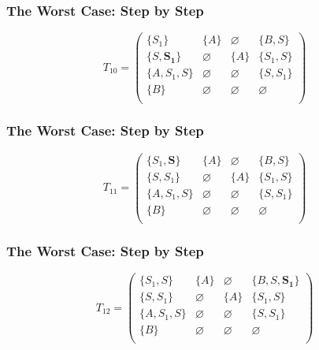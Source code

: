 \documentclass[xcolor=table]{beamer}
\begin{document}
\begin{frame}[noframenumbering]

  \frametitle{The Worst Case: Step by Step}
\begin{figure}[h]
\[
T_{10} = \begin{pmatrix}
\{S_1\}     & \{A\}       & \varnothing & \{B, S\}    \\
\{S, \pmb{S_1}\}       & \varnothing & \{A\}       & \{S_1, S\}     \\
\{A, S_1, S\}  & \varnothing & \varnothing & \{S, S_1\} \\
\{B\}       & \varnothing & \varnothing & \varnothing \\
\end{pmatrix}
\]
\label{ExampleQueryFirstIteration}
\end{figure}
\end{frame}

\begin{frame}[noframenumbering]

  \frametitle{The Worst Case: Step by Step}

\begin{figure}[h]
\[
T_{11} = \begin{pmatrix}
\{S_1, \pmb{S}\}     & \{A\}       & \varnothing & \{B, S\}    \\
\{S, S_1\}       & \varnothing & \{A\}       & \{S_1, S\}     \\
\{A, S_1, S\}  & \varnothing & \varnothing & \{S, S_1\} \\
\{B\}       & \varnothing & \varnothing & \varnothing \\
\end{pmatrix}
\]
\label{ExampleQueryFirstIteration}
\end{figure}
\end{frame}

\begin{frame}[noframenumbering]

  \frametitle{The Worst Case: Step by Step}

\begin{figure}[h]
\[
T_{12} = \begin{pmatrix}
\{S_1, S\}     & \{A\}       & \varnothing & \{B, S, \pmb{S_1}\}    \\
\{S, S_1\}       & \varnothing & \{A\}       & \{S_1, S\}     \\
\{A, S_1, S\}  & \varnothing & \varnothing & \{S, S_1\} \\
\{B\}       & \varnothing & \varnothing & \varnothing \\
\end{pmatrix}
\]
\label{ExampleQueryFirstIteration}
\end{figure}
\end{frame}
\end{document}
